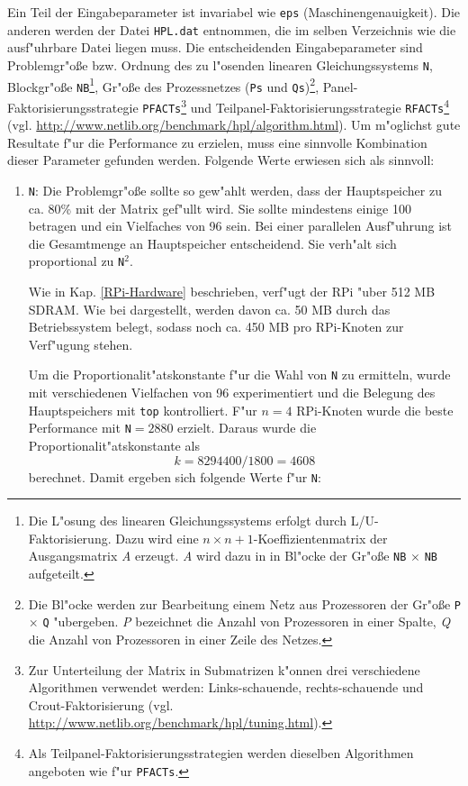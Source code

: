 {Ein Teil der Eingabeparameter ist invariabel wie \texttt{eps} (Maschinengenauigkeit). Die anderen werden der Datei \texttt{HPL.dat} entnommen, die im selben Verzeichnis wie die ausf"uhrbare Datei liegen muss. Die entscheidenden Eingabeparameter sind Problemgr"o\ss e bzw. Ordnung des zu l"osenden linearen Gleichungssystems \texttt{N}, Blockgr"o\ss e \texttt{NB}\footnote{Die L"osung des linearen Gleichungssystems erfolgt durch L/U-Faktorisierung. Dazu wird eine $n\times n+1$-Koeffizientenmatrix der Ausgangsmatrix \textit{A} erzeugt. \textit{A} wird dazu in in Bl"ocke der Gr"o\ss e \texttt{NB} $\times$ \texttt{NB} aufgeteilt.}, Gr"o\ss e des Prozessnetzes (\texttt{Ps} und \texttt{Qs})\footnote{Die Bl"ocke werden zur Bearbeitung einem Netz aus Prozessoren der Gr"o\ss e \texttt{P} $\times$ \texttt{Q} "ubergeben. \textit{P} bezeichnet die Anzahl von Prozessoren in einer Spalte, \textit{Q} die Anzahl von Prozessoren in einer Zeile des Netzes.}, Panel-Faktorisierungsstrategie \texttt{PFACTs}\footnote{Zur Unterteilung der Matrix in Submatrizen k"onnen drei verschiedene Algorithmen verwendet werden: Links-schauende, rechts-schauende und Crout-Faktorisierung (vgl. \url{http://www.netlib.org/benchmark/hpl/tuning.html}).} und Teilpanel-Faktorisierungsstrategie \texttt{RFACTs}\footnote{Als Teilpanel-Faktorisierungsstrategien werden dieselben Algorithmen angeboten wie f"ur \texttt{PFACTs}.} (vgl. \url{http://www.netlib.org/benchmark/hpl/algorithm.html}). Um m"og\-lichst gute Resultate f"ur die Performance zu erzielen, muss eine sinnvolle Kombination dieser Parameter gefunden werden. Folgende Werte erwiesen sich als sinnvoll: 
\begin{enumerate} 
	\item \texttt{N}: Die Problemgr"o\ss e sollte so gew"ahlt werden, dass der Hauptspeicher zu ca. 80\% mit der Matrix gef"ullt wird. Sie sollte mindestens einige 100 betragen und ein Vielfaches von 96 sein. Bei einer parallelen Ausf"uhrung ist die Gesamtmenge an Hauptspeicher entscheidend. Sie verh"alt sich proportional zu \texttt{N}$^2$. 
	
Wie in Kap. \ref{RPi-Hardware} beschrieben, verf"ugt der RPi "uber 512 MB SDRAM. Wie bei \cite{kli13} dargestellt, werden davon ca. 50 MB durch das Betriebssystem belegt, sodass noch ca. 450 MB pro RPi-Knoten zur Verf"ugung stehen. 

Um die Proportionalit"atskonstante f"ur die Wahl von \texttt{N} zu ermitteln, wurde mit verschiedenen Vielfachen von 96 experimentiert und die Belegung des Hauptspeichers mit \texttt{top} kontrolliert. F"ur $n=4$ RPi-Knoten wurde die beste Performance mit \texttt{N}$=2880$ erzielt. Daraus wurde die Proportionalit"atskonstante als \[k=8294400/1800=4608\] berechnet. Damit ergeben sich folgende Werte f"ur \texttt{N}:


\end{enumerate}}
